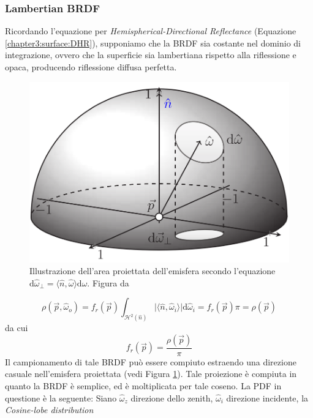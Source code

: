 \subsubsection{Lambertian BRDF}
Ricordando l'equazione per \textit{Hemispherical-Directional Reflectance} (Equazione \ref{chapter3:surface:DHR}), supponiamo che la BRDF sia costante
nel dominio di integrazione, ovvero che la superficie sia lambertiana rispetto alla riflessione e opaca\footnotemark{}, producendo riflessione diffusa
perfetta.
\begin{figure}[tb]
	\centering
	\includegraphics[width=0.8\linewidth]{../assets/chapter3_surface_projected_area.png}
	\caption{Illustrazione dell'area proiettata dell'emisfera secondo l'equazione 
		\mbox{$\mathrm{d}\hat{\omega}_\perp=\langle\hat{n},\hat{\omega}\rangle\mathrm{d}\hat{\omega}$}. Figura da \cite{pegoraro}}
	\label{chapter3:surface:projectedArea}
\end{figure}
\begin{equation}
	\rho(\vec{p},\hat{\omega}_o) = f_r(\vec{p})\int_{\mathcal{H}^2(\hat{n})}\vert\langle\hat{n},\hat{\omega}_i\rangle\vert\mathrm{d}\hat{\omega}_i%
		= f_r(\vec{p})\pi = \rho(\vec{p})
\end{equation}
da cui
\begin{equation}
	f_r(\vec{p}) = \frac{\rho(\vec{p})}{\pi}
\end{equation}
Il campionamento di tale BRDF pu\`o essere compiuto estraendo una direzione casuale nell'emisfera proiettata (vedi Figura 
\ref{chapter3:surface:projectedArea}). Tale proiezione \`e compiuta in quanto la BRDF \`e semplice, ed \`e moltiplicata per tale coseno. La PDF in
questione \`e la seguente: Siano $\hat{\omega}_z$ direzione dello zenith, $\hat{\omega}_i$ direzione incidente, la \textit{Cosine-lobe distribution} 
